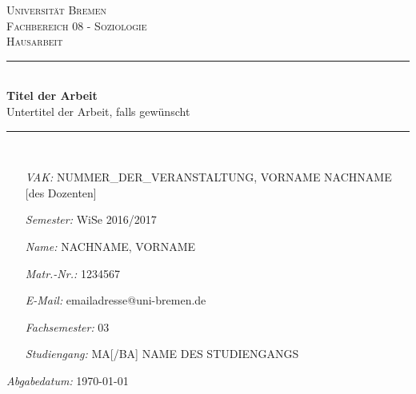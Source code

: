 \begin{titlepage}
\thispagestyle{empty}
\newcommand{\HRule}{\rule{\linewidth}{0.5mm}}
\hspace{1cm}
\center

\textsc{\huge Universität Bremen}\\[2.0cm]
\textsc{\Large Fachbereich 08 - Soziologie}\\[0.8cm]
\MSonehalfspacing
\textsc{\Large Hausarbeit}\\[1.0cm]

\HRule\\[1.4cm]
\MSdoublespacing
{ \huge \bfseries Titel der Arbeit}\\[0.2cm]
{ \large Untertitel der Arbeit, falls gewünscht}\\[0.3cm] %
\HRule \\[2.4cm]
\MSonehalfspacing

\begin{minipage}[t]{0.8\textwidth}
	\begin{itemize}
	\item[\emph{VAK:}] NUMMER_DER_VERANSTALTUNG, VORNAME NACHNAME [des Dozenten]
	\item[\emph{Semester:}] WiSe 2016/2017
	\item[\emph{Name:}] NACHNAME, VORNAME
	\item[\emph{Matr.-Nr.:}] 1234567
	\item[\emph{E-Mail:}] emailadresse@uni-bremen.de
	\item[\emph{Fachsemester:}] 03
	\item[\emph{Studiengang:}] MA[/BA] NAME DES STUDIENGANGS
	\end{itemize}
\end{minipage}

\vspace{2.9cm}

\flushright \emph{Abgabedatum:} \today
\end{titlepage}
\restoregeometry

\tableofcontents
{}
\thispagestyle{empty}

\MSonehalfspacing
\newpage
\setcounter{page}{1}
\pagestyle{fancy}